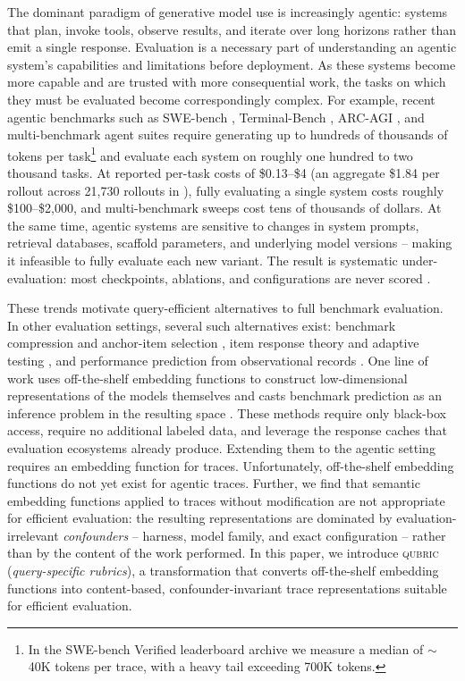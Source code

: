 \documentclass{article}
\newcommand{\qubric}{\textsc{qubric}}
\begin{document}
The dominant paradigm of generative model use is increasingly agentic: systems that plan, invoke tools, observe results, and iterate over long horizons rather than emit a single response.
Evaluation is a necessary part of understanding an agentic system's capabilities and limitations before deployment.
As these systems become more capable and are trusted with more consequential work, the tasks on which they must be evaluated become correspondingly complex.
For example, recent agentic benchmarks such as SWE-bench \citep{jimenez2024swebench, openai2024verified}, Terminal-Bench \citep{tbench2026}, ARC-AGI \citep{chollet2019measure}, and multi-benchmark agent suites \citep{kapoor2025hal} require generating up to hundreds of thousands of tokens per task\footnote{In the SWE-bench Verified leaderboard archive we measure a median of $\sim$40K tokens per trace, with a heavy tail exceeding 700K tokens.} and evaluate each system on roughly one hundred to two thousand tasks.
At reported per-task costs of \$0.13--\$4 (an aggregate \$1.84 per rollout across 21{,}730 rollouts in \citealp{kapoor2025hal}), fully evaluating a single system costs roughly \$100--\$2{,}000, and multi-benchmark sweeps cost tens of thousands of dollars.
At the same time, agentic systems are sensitive to changes in system prompts, retrieval databases, scaffold parameters, and underlying model versions -- making it infeasible to fully evaluate each new variant.
The result is systematic under-evaluation: most checkpoints, ablations, and configurations are never scored \citep{kapoor2024agents}.

These trends motivate query-efficient alternatives to full benchmark evaluation.
In other evaluation settings, several such alternatives exist: benchmark compression and anchor-item selection \citep{vivek2024anchor, maiapolo2024tinybenchmarks}, item response theory and adaptive testing \citep{kipnis2025metabench, truong2025amortized}, and performance prediction from observational records \citep{ruan2024observational, zhuang2025embedllm}.
One line of work uses off-the-shelf embedding functions to construct low-dimensional representations of the models themselves and casts benchmark prediction as an inference problem in the resulting space \citep{duderstadt2023data, helm2025statistical, helm2026query}.
These methods require only black-box access, require no additional labeled data, and leverage the response caches that evaluation ecosystems already produce.
Extending them to the agentic setting requires an embedding function for traces.
Unfortunately, off-the-shelf embedding functions do not yet exist for agentic traces.
Further, we find that semantic embedding functions applied to traces without modification are not appropriate for efficient evaluation: the resulting representations are dominated by evaluation-irrelevant \emph{confounders} -- harness, model family, and exact configuration -- rather than by the content of the work performed.
In this paper, we introduce \qubric{} (\emph{query-specific rubrics}), a transformation that converts off-the-shelf embedding functions into content-based, confounder-invariant trace representations suitable for efficient evaluation.
\end{document}
